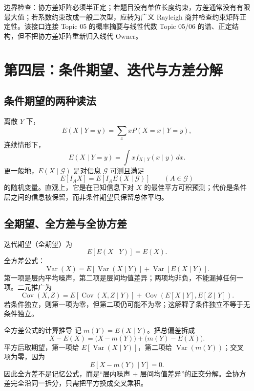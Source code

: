 \documentclass[11pt,a4paper]{ctexart}
\begin{document}
边界检查：协方差矩阵必须半正定；若题目没有单位长度约束，方差通常没有有限最大值；若系数约束改成一般二次型，应转为广义 Rayleigh 商并检查约束矩阵正定性。该接口连接 Topic 05 的概率摘要与线性代数 Topic 05/06 的谱、正定结构，但不把协方差矩阵重新归入线代 Owner。

\section{第四层：条件期望、迭代与方差分解}

\subsection{条件期望的两种读法}

离散 $Y$ 下，
\[
E(X\mid Y=y)=\sum_xxP(X=x\mid Y=y),
\]
连续情形下，
\[
E(X\mid Y=y)=\int xf_{X\mid Y}(x\mid y)\,dx.
\]
更一般地，$E(X\mid\mathcal G)$ 是对信息 $\mathcal G$ 可测且满足
\[
E[I_AX]=E[I_AE(X\mid\mathcal G)]\qquad(A\in\mathcal G)
\]
的随机变量。直观上，它是在已知信息下对 $X$ 的最佳平方可积预测；代价是条件层之间的信息被保留，而非条件期望只保留总体平均。

\subsection{全期望、全方差与全协方差}

迭代期望（全期望）为
\[
\boxed{E[E(X\mid Y)]=E(X)}.
\]
全方差公式：
\[
\boxed{\operatorname{Var}(X)=E[\operatorname{Var}(X\mid Y)]+\operatorname{Var}[E(X\mid Y)]}.
\]
第一项是层内平均噪声，第二项是层间均值差异；两项均非负，不能漏掉任何一项。二元推广为
\[
\boxed{\operatorname{Cov}(X,Z)=E[\operatorname{Cov}(X,Z\mid Y)]+\operatorname{Cov}(E[X\mid Y],E[Z\mid Y])}.
\]
若条件独立，则第一项为零，但第二项仍可能不为零；这解释了条件独立不等于无条件独立。

\begin{methodbox}{全方差公式的计算推导}
记 $m(Y)=E(X\mid Y)$。把总偏差拆成
\[
X-E(X)=\bigl(X-m(Y)\bigr)+\bigl(m(Y)-E(X)\bigr).
\]
平方后取期望，第一项给 $E[\operatorname{Var}(X\mid Y)]$，第二项给 $\operatorname{Var}(m(Y))$；交叉项为零，因为
\[
E[X-m(Y)\mid Y]=0.
\]
因此全方差不是记忆公式，而是“层内噪声 + 层间均值差异”的正交分解。全协方差完全沿同一拆分，只需把平方换成交叉乘积。
\end{methodbox}
\end{document}

